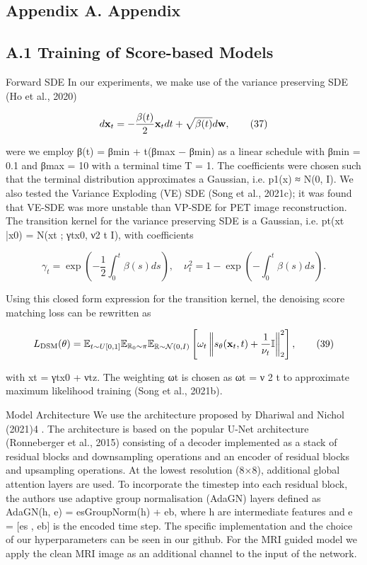 \documentclass{article}
\begin{document}
\subsection{Appendix A. Appendix}

\subsection{A.1 Training of Score-based Models}

Forward SDE In our experiments, we make use of the variance preserving SDE (Ho et al., 2020)

$$d{\bf x}_{t}=-\frac{\beta(t)}{2}{\bf x}_{t}dt+\sqrt{\beta(t)}d{\bf w},\tag{37}$$

were we employ β(t) = βmin + t(βmax − βmin) as a linear schedule with βmin = 0.1 and βmax = 10 with a terminal time T = 1. The coefficients were chosen such that the terminal distribution approximates a Gaussian, i.e. p1(x) ≈ N(0, I). We also tested the Variance Exploding (VE) SDE (Song et al., 2021c); it was found that VE-SDE was more unstable than VP-SDE for PET image reconstruction. The transition kernel for the variance preserving SDE is a Gaussian, i.e. pt(xt |x0) = N(xt ; γtx0, ν2 t I), with coefficients

$$\gamma_{t}=\exp\left(-\frac{1}{2}\int_{0}^{t}\beta(s)ds\right),\quad\nu_{t}^{2}=1-\exp\left(-\int_{0}^{t}\beta(s)ds\right).\tag{38}$$

Using this closed form expression for the transition kernel, the denoising score matching loss can be rewritten as

$$L_{\rm DSM}(\theta)=\mathbb{E}_{t\sim U[0,1]}\mathbb{E}_{\mathbb{R}_{0}\sim\pi}\mathbb{E}_{\mathbb{R}\sim\mathcal{N}(0,I)}\left[\omega_{t}\left\|s_{\theta}(\mathbf{x}_{t},t)+\frac{1}{\nu_{t}}\mathbb{I}\right\|_{2}^{2}\right],\tag{39}$$

with xt = γtx0 + νtz. The weighting ωt is chosen as ωt = ν 2 t to approximate maximum likelihood training (Song et al., 2021b).

Model Architecture We use the architecture proposed by Dhariwal and Nichol (2021)4 . The architecture is based on the popular U-Net architecture (Ronneberger et al., 2015) consisting of a decoder implemented as a stack of residual blocks and downsampling operations and an encoder of residual blocks and upsampling operations. At the lowest resolution (8×8), additional global attention layers are used. To incorporate the timestep into each residual block, the authors use adaptive group normalisation (AdaGN) layers defined as AdaGN(h, e) = esGroupNorm(h) + eb, where h are intermediate features and e = [es , eb] is the encoded time step. The specific implementation and the choice of our hyperparameters can be seen in our github. For the MRI guided model we apply the clean MRI image as an additional channel to the input of the network.
\end{document}
